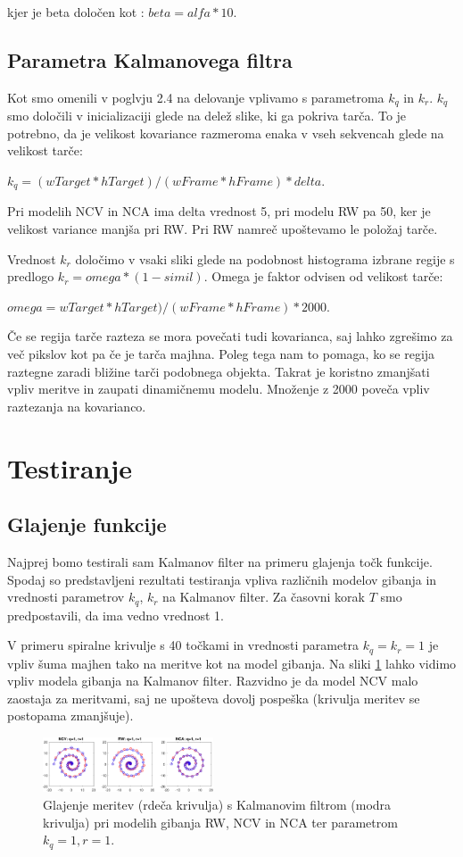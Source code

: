 \documentclass[a4paper]{article}
\begin{document}
kjer je beta določen kot : $beta = alfa*10$.

\subsection{Parametra Kalmanovega filtra}
Kot smo omenili v poglvju 2.4 na delovanje vplivamo s parametroma $k_q$ in $k_r$. $k_q$ smo določili v inicializaciji glede na delež slike, ki ga pokriva tarča. To je potrebno, da je velikost kovariance razmeroma enaka v vseh sekvencah glede na velikost tarče:

$k_q = (wTarget*hTarget)/(wFrame*hFrame)*delta$. 

Pri modelih NCV in NCA ima delta vrednost 5, pri modelu RW pa 50, ker je velikost variance manjša pri RW. Pri RW namreč upoštevamo le položaj tarče. 

Vrednost $k_r$ določimo v vsaki sliki glede na podobnost histograma izbrane regije s predlogo $k_r = omega*(1-simil)$. Omega je faktor odvisen od velikost tarče: 

$omega = wTarget*hTarget)/(wFrame*hFrame)*2000$. 

Če se regija tarče razteza se mora povečati tudi kovarianca, saj lahko zgrešimo za več pikslov kot pa če je tarča majhna. Poleg tega nam to pomaga, ko se regija raztegne zaradi bližine tarči podobnega objekta. Takrat je koristno zmanjšati vpliv meritve in zaupati dinamičnemu modelu. Množenje z 2000 poveča vpliv raztezanja na kovarianco.

\section{Testiranje}
\subsection{Glajenje funkcije}
Najprej bomo testirali sam Kalmanov filter na primeru glajenja točk funkcije.
Spodaj so predstavljeni rezultati testiranja vpliva različnih modelov gibanja in vrednosti parametrov $k_q$, $k_r$ na Kalmanov filter. Za časovni korak $T$ smo predpostavili, da ima vedno vrednost 1.

V primeru spiralne krivulje s 40 točkami in vrednosti parametra $k_q = k_r = 1$ je vpliv šuma majhen tako na meritve kot na model gibanja. Na sliki \ref{q1r1} lahko vidimo vpliv modela gibanja na Kalmanov filter. Razvidno je da model NCV malo zaostaja za meritvami, saj ne upošteva dovolj pospeška (krivulja meritev se postopama zmanjšuje).
\begin{figure}[h]
	\begin{center}
		\includegraphics [width=0.45\textwidth] {q1r1.pdf}
	\end{center}
	\caption{Glajenje meritev (rdeča krivulja) s Kalmanovim filtrom (modra krivulja) pri modelih gibanja RW, NCV in NCA ter parametrom $k_q=1, r=1$. }
	\label{q1r1}
\end{figure}  
\end{document}
